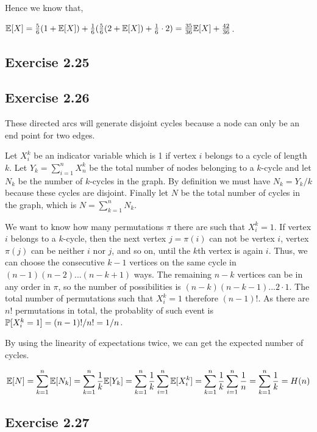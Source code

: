 Hence we know that,

$\E[X] = \frac{5}{6}(1 + \E[X]) + \frac{1}{6}(\frac{5}{6}(2+\E[X]) + \frac{1}{6}\cdot 2)
= \frac{35}{36}\E[X] + \frac{42}{36}$.

\subsection*{Exercise 2.25}

\subsection*{Exercise 2.26}

These directed arcs will generate disjoint cycles because a node can only be an end point for two
edges. 

Let $X_i^k$ be an indicator variable which is 1 if vertex $i$ belongs to a cycle of length $k$.
Let $Y_k = \sum_{i=1}^{n} X_n^k$ be the total number of nodes belonging to a $k$-cycle and let
$N_k$ be the number of $k$-cycles in the graph. By definition we must have $N_k = Y_k/k$
because these cycles are disjoint. Finally
let $N$ be the total number of cycles in the graph, which is $N = \sum_{k=1}^{n}N_k$.

We want to know how many permutations $\pi$ there are such that $X_i^k = 1$. If vertex $i$ belongs
to a $k$-cycle, then the next vertex $j = \pi(i)$ can not be vertex $i$, vertex $\pi(j)$ can be neither
$i$ nor $j$, and so on, until the $k$th vertex is again $i$. Thus, we can choose the consecutive $k-1$
vertices on the same cycle in $(n-1)(n-2)...(n-k+1)$ ways. The remaining $n-k$ vertices can be in any
order in $\pi$, so the number of possibilities is $(n-k)(n-k-1)...2\cdot 1$. The total number of permutations
such that $X_i^k = 1$ therefore $(n-1)!$. As there are $n!$ permutations in total, the probablity of such event
is $\P[X_i^k = 1] = (n-1)!/n! = 1/n$.

By using the linearity of expectations twice, we can get the expected number of cycles.

\begin{equation*}
\E[N] = \sum_{k=1}^{n}\E[N_k] = \sum_{k=1}^{n}\frac{1}{k}\E[Y_k]
= \sum_{k=1}^{n}\frac{1}{k} \sum_{i=1}^{n}\E[X_i^k] = 
\sum_{k=1}^{n}\frac{1}{k} \sum_{i=1}^{n}\frac{1}{n} = \sum_{k=1}^{n}\frac{1}{k} = H(n)
\end{equation*}

\subsection*{Exercise 2.27}

